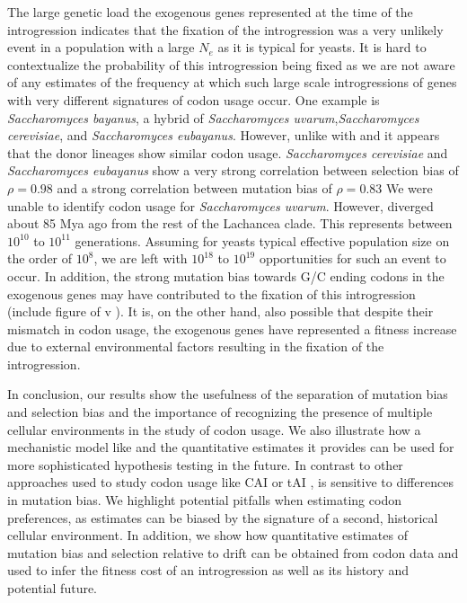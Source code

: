 \documentclass[12pt]{article}
\begin{document}
The large genetic load the exogenous genes represented at the time of the introgression indicates that the fixation of the introgression was a very unlikely event in a population with a large $N_e$ as it is typical for yeasts.
It is hard to contextualize the probability of this introgression being fixed as we are not aware of any estimates of the frequency at which such large scale introgressions of genes with very different signatures of codon usage occur.
One example is \textit{Saccharomyces bayanus}, a hybrid of \textit{Saccharomyces uvarum},\textit{Saccharomyces cerevisiae}, and \textit{Saccharomyces eubayanus}.
However, unlike with \kluyveri and \gossypii it appears that the donor lineages show similar codon usage.
\textit{Saccharomyces cerevisiae} and \textit{Saccharomyces eubayanus} show a very strong correlation between selection bias \DE of $\rho = 0.98$ and a strong correlation between mutation bias \DM of $ \rho = 0.83$
We were unable to identify codon usage for \textit{Saccharomyces uvarum}.
However, \kluyveri diverged about 85 Mya ago from the rest of the Lachancea clade.
This represents between $10^{10}$ to $10^{11}$ generations.
Assuming for yeasts typical effective population size on the order of $10^8$, we are left with $10^{18}$ to $10^{19}$ opportunities for such an event to occur.
In addition, the strong mutation bias towards G/C ending codons in the exogenous genes may have contributed to the fixation of this introgression (include figure of \DM v \DE).
It is, on the other hand, also possible that despite their mismatch in codon usage, the exogenous genes have represented a fitness increase due to external environmental factors resulting in the fixation of the introgression.
 
In conclusion, our results show the usefulness of the separation of mutation bias and selection bias and the importance of recognizing the presence of multiple cellular environments in the study of codon usage.
We also illustrate how a mechanistic model like \ROC and the quantitative estimates it provides can be used for more sophisticated hypothesis testing in the future.
In contrast to other approaches used to study codon usage like CAI \citep{sharp1987} or tAI \citep{dosreis2004}, \ROC is sensitive to differences in mutation bias.
We highlight potential pitfalls when estimating codon preferences, as estimates can be biased by the signature of a second, historical cellular environment.
In addition, we show how quantitative estimates of mutation bias and selection relative to drift can be obtained from codon data and used to infer the fitness cost of an introgression as well as its history and potential future.
\end{document}
